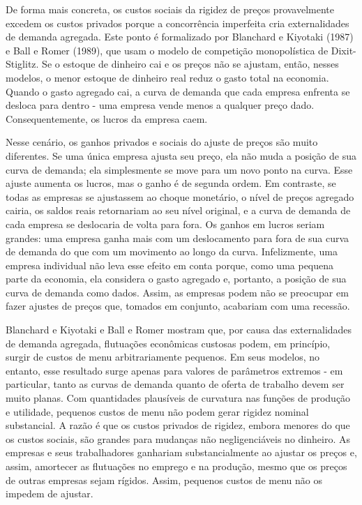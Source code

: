 \documentclass[a4paper,12pt]{article}[abntex2]
\begin{document}
De forma mais concreta, os custos sociais da rigidez de preços provavelmente excedem os custos privados porque a concorrência imperfeita cria externalidades de demanda agregada. Este ponto é formalizado por Blanchard e Kiyotaki (1987) e Ball e Romer (1989), que usam o modelo de competição monopolística de Dixit-Stiglitz. Se o estoque de dinheiro cai e os preços não se ajustam, então, nesses modelos, o menor estoque de dinheiro real reduz o gasto total na economia. Quando o gasto agregado cai, a curva de demanda que cada empresa enfrenta se desloca para dentro - uma empresa vende menos a qualquer preço dado. Consequentemente, os lucros da empresa caem.

Nesse cenário, os ganhos privados e sociais do ajuste de preços são muito diferentes. Se uma única empresa ajusta seu preço, ela não muda a posição de sua curva de demanda; ela simplesmente se move para um novo ponto na curva. Esse ajuste aumenta os lucros, mas o ganho é de segunda ordem. Em contraste, se todas as empresas se ajustassem ao choque monetário, o nível de preços agregado cairia, os saldos reais retornariam ao seu nível original, e a curva de demanda de cada empresa se deslocaria de volta para fora. Os ganhos em lucros seriam grandes: uma empresa ganha mais com um deslocamento para fora de sua curva de demanda do que com um movimento ao longo da curva. Infelizmente, uma empresa individual não leva esse efeito em conta porque, como uma pequena parte da economia, ela considera o gasto agregado e, portanto, a posição de sua curva de demanda como dados. Assim, as empresas podem não se preocupar em fazer ajustes de preços que, tomados em conjunto, acabariam com uma recessão.

Blanchard e Kiyotaki e Ball e Romer mostram que, por causa das externalidades de demanda agregada, flutuações econômicas custosas podem, em princípio, surgir de custos de menu arbitrariamente pequenos. Em seus modelos, no entanto, esse resultado surge apenas para valores de parâmetros extremos - em particular, tanto as curvas de demanda quanto de oferta de trabalho devem ser muito planas. Com quantidades plausíveis de curvatura nas funções de produção e utilidade, pequenos custos de menu não podem gerar rigidez nominal substancial. A razão é que os custos privados de rigidez, embora menores do que os custos sociais, são grandes para mudanças não negligenciáveis no dinheiro. As empresas e seus trabalhadores ganhariam substancialmente ao ajustar os preços e, assim, amortecer as flutuações no emprego e na produção, mesmo que os preços de outras empresas sejam rígidos. Assim, pequenos custos de menu não os impedem de ajustar.
\end{document}
